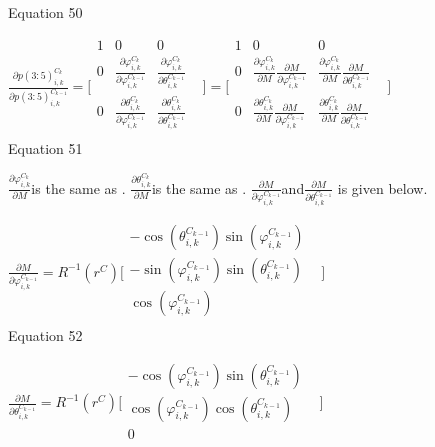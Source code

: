 Equation 50



$\frac{\partial p(3:5)_{i,k}^{C_{k}}}{\partial 
p(3:5)_{i,k}^{C_{k-1}}}=\lbrack \begin{matrix}
1 & 0 & 0 & \\
0 & \frac{\partial \varphi _{i, k}^{C_{k}}}{\partial \varphi _{i, 
k}^{C_{k-1}}} & \frac{\partial \varphi _{i, k}^{C_{k}}}{\partial \theta 
_{i, k}^{C_{k-1}}} & \\
0 & \frac{\partial \theta _{i, k}^{C_{k}}}{\partial \varphi _{i, 
k}^{C_{k-1}}} & \frac{\partial \theta _{i, k}^{C_{k}}}{\partial \theta 
_{i, k}^{C_{k-1}}} & \\
\end{matrix}
\rbrack =\lbrack \begin{matrix}
1 & 0 & 0 & \\
0 & \frac{\partial \varphi _{i, k}^{C_{k}}}{\partial M}\frac{\partial 
M}{\partial \varphi _{i, k}^{C_{k-1}}} & \frac{\partial \varphi _{i, 
k}^{C_{k}}}{\partial M}\frac{\partial M}{\partial \theta _{i, 
k}^{C_{k-1}}} & \\
0 & \frac{\partial \theta _{i, k}^{C_{k}}}{\partial M}\frac{\partial 
M}{\partial \varphi _{i, k}^{C_{k-1}}} & \frac{\partial \theta _{i, 
k}^{C_{k}}}{\partial M}\frac{\partial M}{\partial \theta _{i, 
k}^{C_{k-1}}} & \\
\end{matrix}
\rbrack $\\


Equation 51

$\frac{\partial \varphi _{i, k}^{C_{k}}}{\partial M}$is the same as . 
$\frac{\partial \theta _{i, k}^{C_{k}}}{\partial M}$is the same as . 
$\frac{\partial M}{\partial \varphi _{i,k}^{C_{k-1}}}$and$
\frac{\partial M}{\partial \theta _{i, k}^{C_{k-1}}}$ is given below.

$\frac{\partial M}{\partial \varphi 
_{i,k}^{C_{k-1}}}=R^{-1}(r^{C})\lbrack \begin{matrix}
-\cos (\theta _{i, k}^{C_{k-1}})\sin (\varphi _{i,k}^{C_{k-1}}) & \\
-\sin (\varphi _{i,k}^{C_{k-1}})\sin (\theta _{i, k}^{C_{k-1}}) & \\
\cos (\varphi _{i,k}^{C_{k-1}}) & \\
\end{matrix}
\rbrack $\\


Equation 52

$\frac{\partial M}{\partial \theta _{i, 
k}^{C_{k-1}}}=R^{-1}(r^{C})\lbrack \begin{matrix}
-\cos (\varphi _{i,k}^{C_{k-1}})\sin (\theta _{i, k}^{C_{k-1}}) & \\
\cos (\varphi _{i,k}^{C_{k-1}})\cos (\theta _{i, k}^{C_{k-1}}) & \\
0 & \\
\end{matrix}
\rbrack $\\


